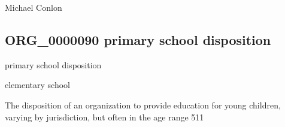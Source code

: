 \documentclass[letterpaper,10pt,english]{sphinxmanual}
\begin{document}
\begin{sphinxShadowBox}

\sphinxAtStartPar
Michael Conlon 
\end{sphinxShadowBox}
\begin{quote}

\ignorespaces \end{quote}


\subsection{ORG\_0000090 \sphinxhyphen{} primary school disposition}
\label{\detokenize{doc-ORG_0000090:org-0000090-primary-school-disposition}}\label{\detokenize{doc-ORG_0000090:index-0}}\label{\detokenize{doc-ORG_0000090::doc}}
\begin{sphinxShadowBox}

\sphinxAtStartPar
primary school disposition
\end{sphinxShadowBox}

\begin{sphinxShadowBox}

\sphinxAtStartPar
elementary school
\end{sphinxShadowBox}

\begin{sphinxShadowBox}

\sphinxAtStartPar
{\hyperref[\detokenize{doc-BFO_0000016::doc}]{}}
\end{sphinxShadowBox}

\begin{sphinxShadowBox}

\sphinxAtStartPar
The disposition of an organization to provide education for young children, varying by jurisdiction, but often in the age range 5\sphinxhyphen{}11
\end{sphinxShadowBox}

\begin{sphinxShadowBox}

\sphinxAtStartPar
{}
\end{sphinxShadowBox}
\end{document}

